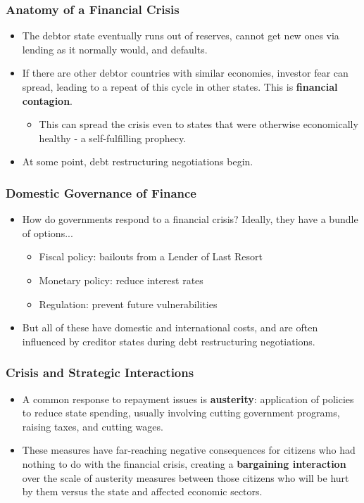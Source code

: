 \documentclass[handout]{beamer}
\begin{document}
\begin{frame} 
	\frametitle{\LARGE{Anatomy of a Financial Crisis}}
	\begin{itemize}
		\item The debtor state eventually runs out of reserves, cannot get new ones via lending as it normally would, and defaults. \pause
		\item If there are other debtor countries with similar economies, investor fear can spread, leading to a repeat of this cycle in other states. This is \textbf{financial contagion}. \pause
		\begin{itemize}
			\item This can spread the crisis even to states that were otherwise economically healthy - a self-fulfilling prophecy. \pause
		\end{itemize}
		\item At some point, debt restructuring negotiations begin.		
	\end{itemize}
\end{frame}

\begin{frame} 
	\frametitle{\LARGE{Domestic Governance of Finance}}
	\begin{itemize}
		\item How do governments respond to a financial crisis? Ideally, they  have a bundle of options... \pause
		\begin{itemize}
			\item Fiscal policy: bailouts from a Lender of Last Resort \pause 
			\item Monetary policy: reduce interest rates \pause 
			\item Regulation: prevent future vulnerabilities \pause
		\end{itemize}		
		\item But all of these have domestic and international costs, and are often influenced by creditor states during debt restructuring negotiations. 		
	\end{itemize}
\end{frame}

\begin{frame} 
	\frametitle{\LARGE{Crisis and Strategic Interactions}}
	\begin{itemize}
		\item A common response to repayment issues is \textbf{austerity}: application of policies to reduce state spending, usually involving cutting government programs, raising taxes, and cutting wages. \pause
		\item These measures have far-reaching negative consequences for citizens who had nothing to do with the financial crisis, creating a \textbf{bargaining interaction} over the scale of austerity measures between those citizens who will be hurt by them versus the state and affected economic sectors.
	\end{itemize}
\end{frame}
\end{document}

